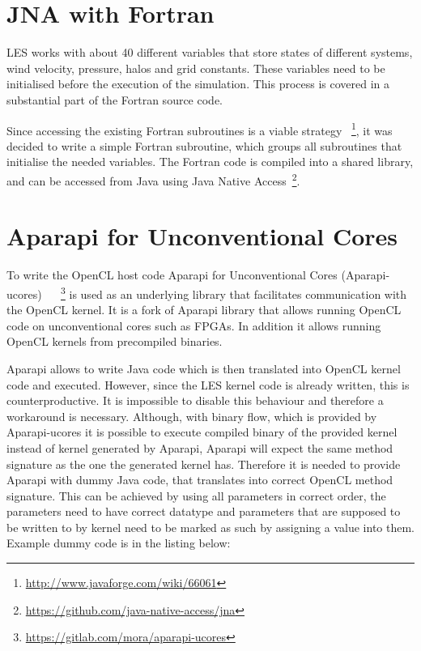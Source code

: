 \documentclass{l4proj}
\begin{document}
\section{JNA with Fortran}

LES works with about 40 different variables that store states of different systems,
wind velocity, pressure, halos and grid constants. These variables need to be initialised
before the execution of the simulation. This process is covered in a substantial part of
the Fortran source code.

Since accessing the existing Fortran subroutines is a viable strategy
~\footnote{\url{http://www.javaforge.com/wiki/66061}},
it was decided to write a simple Fortran subroutine, which groups 
all subroutines that initialise the needed variables. The Fortran code
is compiled into a shared library, and can be accessed from Java using
Java Native Access~\footnote{\url{https://github.com/java-native-access/jna}}.

\section{Aparapi for Unconventional Cores}

To write the OpenCL host code Aparapi for Unconventional Cores (Aparapi-ucores)
~\cite{aparapi_ucores}
~\footnote{\url{https://gitlab.com/mora/aparapi-ucores}}
is used as an underlying library that facilitates communication
with the OpenCL kernel. It is a fork of Aparapi library that allows
running OpenCL code on unconventional cores such as FPGAs. In addition
it allows running OpenCL kernels from precompiled binaries.

Aparapi allows to write Java code which is then translated into OpenCL kernel code
and executed. However, since the LES kernel code is already written, this is 
counterproductive. It is impossible to disable this behaviour and therefore a 
workaround is necessary. Although, with binary flow, which is provided by Aparapi-ucores
it is possible to execute compiled binary of the provided kernel instead of 
kernel generated by Aparapi, Aparapi will expect the same method signature as 
the one the generated kernel has. Therefore it is needed to provide Aparapi with
dummy Java code, that translates into correct OpenCL method signature.
This can be achieved by using all parameters in correct order, the parameters
need to have correct datatype and parameters that are supposed to be written to
by kernel need to be marked as such by assigning a value into them. Example dummy
code is in the listing below:
\end{document}
